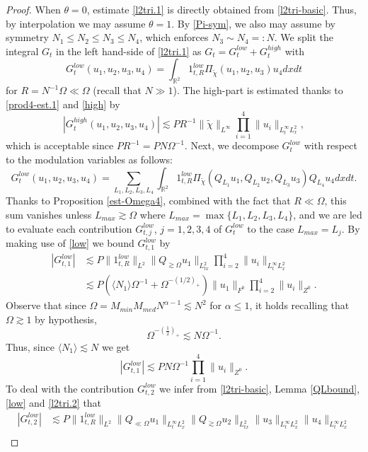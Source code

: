 \documentclass{amsart}
\theoremstyle{definition}
\theoremstyle{remark}
\def\R{{\mathbb R}}
\numberwithin{equation}{section}
\newcommand\cro[1]{\langle #1 \rangle}
\begin{document}
\begin{proof}
  When $\theta = 0$, estimate \eqref{l2tri.1} is directly obtained from \eqref{l2tri-basic}. Thus, by interpolation we may assume $\theta=1$. By \eqref{Pi-sym}, we also may assume by symmetry $N_1\le N_2\le N_3\le N_4$, which enforces $N_3\sim N_4 =: N$. We split the integral $G_t$ in the left hand-side of \eqref{l2tri.1} as $G_t = G_t^{low} + G_t^{high}$ with
  $$
     G_t^{low}(u_1,u_2,u_3,u_4) = \int_{\R^2} 1_{t,R}^{low} \Pi_{\widetilde{\chi}}(u_1,u_2,u_3)u_4 dxdt
  $$
  for $R=N^{-1}\Omega \ll \Omega$ (recall that $N\gg 1$). The high-part is estimated thanks to \eqref{prod4-est.1} and \eqref{high} by
  \begin{equation}
    |G_t^{high}(u_1,u_2,u_3,u_4)| \lesssim PR^{-1} \|\widetilde{\chi}\|_{L^\infty} \prod_{i=1}^4 \|u_i\|_{L^\infty_tL^2_x},
  \end{equation}
  which is acceptable since $PR^{-1} = PN\Omega^{-1}$.
  Next, we decompose $G_t^{low}$ with respect to the modulation variables as follows:
  $$
  G_t^{low}(u_1,u_2,u_3,u_4) = \sum_{L_1,L_2,L_3,L_4} \int_{\R^2} 1_{t,R}^{low} \Pi_{\widetilde{\chi}}(Q_{L_1}u_1,Q_{L_2}u_2,Q_{L_3}u_3)Q_{L_4}u_4 dxdt.
  $$
  Thanks to Proposition \ref{est-Omega4}, combined with the fact that $R\ll \Omega$, this sum vanishes unless $L_{max}\gtrsim \Omega$ where $L_{max}=\max\{L_1,L_2,L_3,L_4\}$, and we are led to evaluate each contribution $G_{t,j}^{low}$, $j=1,2,3,4$ of $G_t^{low}$ to the case $L_{max}=L_j$. By making use of \eqref{low} we bound $G_{t,1}^{low}$ by
  \begin{align*}
    |G_{t,1}^{low}| &\lesssim P \|1_{t,R}^{low}\|_{L^2} \|Q_{\gtrsim \Omega}u_1\|_{L^2_{tx}}  \prod_{i=2}^4 \|u_i\|_{L^\infty_tL^2_x}\\
    &\lesssim P(\cro{N_1}\Omega^{-1}+\Omega^{-(1/2)_+}) \|u_1\|_{F^0} \prod_{i=2}^4 \|u_i\|_{Z^0}.
  \end{align*}
  Observe that since $\Omega=M_{min}M_{med}N^{\alpha-1}\lesssim N^2$ for $\alpha\le 1$, it holds recalling that $\Omega \gtrsim 1$ by hypothesis,
  \begin{equation}\label{l2tri.2}
   \Omega^{-(\frac 12)_+} \lesssim N\Omega^{-1}.
  \end{equation}
  Thus, since $\cro{N_1}\lesssim N$ we get
  $$
  |G_{t,1}^{low}| \lesssim PN\Omega^{-1} \prod_{i=1}^4 \|u_i\|_{Z^0}.
  $$
  To deal with the contribution $G_{t,2}^{low}$ we infer from \eqref{l2tri-basic}, Lemma \ref{QLbound}, \eqref{low} and \eqref{l2tri.2} that
  \begin{align*}
    |G_{t,2}^{low}| &\lesssim P \|1_{t,R}^{low}\|_{L^2} \|Q_{\ll \Omega}u_1\|_{L^\infty_tL^2_x} \|Q_{\gtrsim \Omega}u_2\|_{L^2_{tx}} \|u_3\|_{L^\infty_tL^2_x} \|u_4\|_{L^\infty_tL^2_x}\\

\end{align*}
\end{proof}
\end{document}
